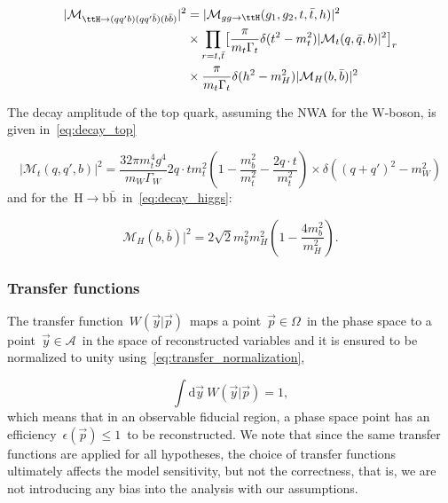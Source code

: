 \begin{align}
\label{eq:scattering_nwa}
|\mathcal{M}_{\ttH \rightarrow (qq'b) (qq'\bar{b}) (b\bar{b})}|^2 &= |\mathcal{M}_{gg \rightarrow \ttH}(g_1, g_2, t, \bar{t}, h)|^2 \\
&\times \prod_{r = t,\bar{t}} \bigl[ \frac{\pi}{m_t \Gamma_t} \delta(t^2 - m_t^2) |\mathcal{M}_t(q,\bar{q},b)|^2 \bigr]_r \\
&\times \frac{\pi}{m_t \Gamma_t} \delta(h^2 - m_H^2) |\mathcal{M}_H(b,\bar{b})|^2
\end{align}

The decay amplitude of the top quark, assuming the NWA for the W-boson, is given in~\cref{eq:decay_top}

\begin{equation}
\label{eq:decay_top}
|\mathcal{M}_t(q,q',b)|^2 = \frac{32\pi m_t^4 g^4}{m_W \Gamma_W} {2 q\cdot t}{m_t^2} (1 - \frac{m_b^2}{m_t^2} - \frac{2 q \cdot t}{m_t^2}) \times \delta((q+q')^2 - m_W^2)
\end{equation}
and for the~$\mathrm{H} \rightarrow \mathrm{b}\bar{\mathrm{b}}$~in~\cref{eq:decay_higgs}:

\begin{equation}
\label{eq:decay_higgs}
\mathcal{M}_H(b,\bar{b})|^2 = 2\sqrt{2} m_b^2 m_H^2 (1 - \frac{4m_b^2}{m_H^2}).
\end{equation}

\subsubsection{Transfer functions}
\label{sec:transfer_functions}

The transfer function~$W(\vec{y} | \vec{p})$~maps a point~$\vec{p} \in \Omega$~in the phase space to a point~$\vec{y} \in \mathcal{A}$~in the space of reconstructed variables and it is ensured to be normalized to unity using~\cref{eq:transfer_normalization},

\begin{equation}
\label{eq:transfer_normalization}
\int \mathrm{d}\vec{y}~W(\vec{y} | \vec{p}) = 1,
\end{equation}
which means that in an observable fiducial region, a phase space point has an efficiency~$\epsilon(\vec{p}) \leq 1$~to be reconstructed. We note that since the same transfer functions are applied for all hypotheses, the choice of transfer functions ultimately affects the model sensitivity, but not the correctness, that is, we are not introducing any bias into the analysis with our assumptions.

